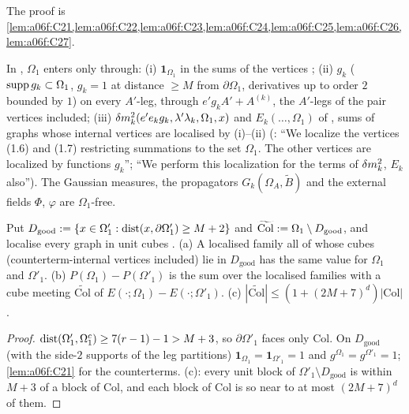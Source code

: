 The proof is \cref{lem:a06f:C21,lem:a06f:C22,lem:a06f:C23,lem:a06f:C24,lem:a06f:C25,lem:a06f:C26,lem:a06f:C27}.

\begin{lemma}\label{lem:a06f:C21}
In \cite[(1.4)--(1.5)]{Ba3}, $\Omega_1$ enters only through: \textup{(i)} $\mathbf 1_{\Omega_1}$ in the sums of the vertices \cite[(1.6)--(1.7)]{Ba3}; \textup{(ii)} $g_k$ ($\operatorname{supp} g_k\subset\Omega_1$, $g_k=1$ at distance $\ge M$ from $\partial\Omega_1$, derivatives up to order $2$ bounded by $1$) on every $A'$-leg, through $e'g_kA'+A^{(k)}$, the $A'$-legs of the pair vertices \cite[(1.14)]{Ba3} included; \textup{(iii)} $\delta m^2_k(e'e_kg_k,\lambda'\lambda_k,\Omega_1,x)$ and $E_k(\dots,\Omega_1)$ of \cite[(1.29)--(1.30)]{Ba3}, sums of graphs whose internal vertices are localised by \textup{(i)}--\textup{(ii)} (\cite[pp.~419--420]{Ba3}: ``We localize the vertices (1.6) and (1.7) restricting summations to the set $\Omega_1$. The other vertices are localized by functions $g_k$''; ``We perform this localization for the terms of $\delta m^2_k$, $E_k$ also''). The Gaussian measures, the propagators $G_k(\Omega_A,\tilde B)$ and the external fields $\Phi$, $\varphi$ are $\Omega_1$-free.
\end{lemma}

\begin{lemma}[marking]\label{lem:a06f:C22}
Put $D_{\mathrm{good}}:=\{x\in\Omega'_1:\operatorname{dist}(x,\partial\Omega'_1)\ge M+2\}$ and $\widetilde{\mathrm{Col}}:=\Omega_1\setminus D_{\mathrm{good}}$, and localise every graph in unit cubes \cite[p.~420]{Ba3}. \textup{(a)} A localised family all of whose cubes (counterterm-internal vertices included) lie in $D_{\mathrm{good}}$ has the same value for $\Omega_1$ and $\Omega'_1$. \textup{(b)} $P(\Omega_1)-P(\Omega'_1)$ is the sum over the localised families with a cube meeting $\widetilde{\mathrm{Col}}$ of $E(\cdot;\Omega_1)-E(\cdot;\Omega'_1)$. \textup{(c)} $|\widetilde{\mathrm{Col}}|\le(1+(2M+7)^d)|\mathrm{Col}|$.
\end{lemma}

\begin{proof}
$\operatorname{dist}(\Omega'_1,\Omega_1^c)\ge7(r-1)-1>M+3$, so $\partial\Omega'_1$ faces only $\mathrm{Col}$. On $D_{\mathrm{good}}$ (with the side-$2$ supports of the leg partitions) $\mathbf 1_{\Omega_1}=\mathbf 1_{\Omega'_1}=1$ and $g^{\Omega_1}=g^{\Omega'_1}=1$; \cref{lem:a06f:C21} for the counterterms. (c): every unit block of $\Omega'_1\setminus D_{\mathrm{good}}$ is within $M+3$ of a block of $\mathrm{Col}$, and each block of $\mathrm{Col}$ is so near to at most $(2M+7)^d$ of them.
\end{proof}

